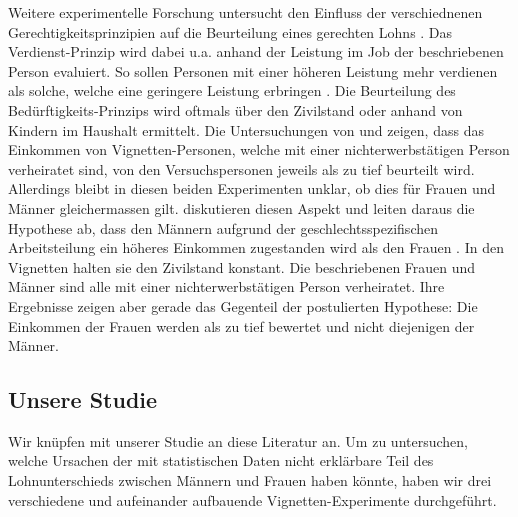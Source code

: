 \documentclass[a4paper,12pt]{article}
\renewcommand{\baselinestretch}{1.1}
\newif\ifcomments
\newcommand{\comment}[1]{%
    \ifcomments\marginpar{\renewcommand{\baselinestretch}{1}\tiny\hspace*{-1.1em}\colorbox{gray!20}%
    {\textcolor{red}{\parbox[t]{.9in}{\raggedright #1}}}}\fi}
\begin{document}
Weitere experimentelle Forschung untersucht den Einfluss der verschiednenen Gerechtigkeitsprinzipien auf die Beurteilung eines gerechten Lohns \citep{Jasso-Rossi-1977}. Das Verdienst-Prinzip wird dabei u.a. anhand der Leistung im Job der beschriebenen Person evaluiert. So sollen Personen mit einer höheren Leistung mehr verdienen als solche, welche eine geringere Leistung erbringen \citep{Auspurg-etal-2017,Gatskova-2015,Jann-2003}. Die Beurteilung des Bedürftigkeits-Prinzips wird oftmals über den Zivilstand oder anhand von Kindern im Haushalt ermittelt. Die Untersuchungen von \citet{Gatskova-2015} und \citet{Sauer-etal-2009} zeigen, dass das Einkommen von Vignetten-Personen, welche mit
einer nichterwerbstätigen Person verheiratet sind, von den Versuchspersonen
jeweils als zu tief beurteilt wird. Allerdings bleibt in diesen beiden
Experimenten unklar, ob dies für Frauen und Männer gleichermassen gilt. 
\citet{Shamon-Duelmer-2014} diskutieren diesen Aspekt und leiten daraus die Hypothese ab,
dass den Männern aufgrund der geschlechtsspezifischen Arbeitsteilung ein
höheres Einkommen zugestanden wird als den Frauen \citep[348]{Shamon-Duelmer-2014}.
In den Vignetten halten sie den Zivilstand
konstant. Die beschriebenen Frauen und Männer sind alle mit einer
nichterwerbstätigen Person verheiratet. Ihre Ergebnisse zeigen aber gerade das
Gegenteil der postulierten Hypothese: Die Einkommen der Frauen werden als zu
tief bewertet und nicht diejenigen der Männer. \comment{Da könnte auch ein
„Kompensations-Effekt“ eine Rolle spielen, denn dass in verheirateten Paaren
nur die Frau erwerbstätig ist, ist ungewöhnlich und hat vermutlich meist
gewichtige Gründe (z.B. Arbeitslosigkeit oder Krankheit des Mannes).}

\subsection{Unsere Studie}
\label{sec:ss5}

Wir knüpfen mit unserer Studie an diese Literatur an. Um zu untersuchen, welche
Ursachen der mit statistischen Daten nicht erklärbare Teil des Lohnunterschieds
zwischen Männern und Frauen haben könnte, haben wir drei verschiedene und aufeinander aufbauende Vignetten-Experimente durchgeführt. 
\comment{hier z.b. auf Auspurg et al. 2017 aufbauen -> habe ich jetzt weiter oben gemacht...}
\end{document}
